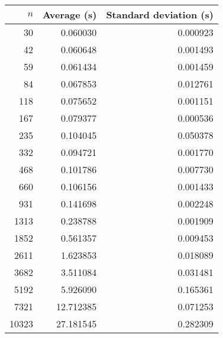 \begin{tabular}{rrr}
$n$ & Average (s) & Standard deviation (s)\\\hline
30 & 0.060030 & 0.000923\\
42 & 0.060648 & 0.001493\\
59 & 0.061434 & 0.001459\\
84 & 0.067853 & 0.012761\\
118 & 0.075652 & 0.001151\\
167 & 0.079377 & 0.000536\\
235 & 0.104045 & 0.050378\\
332 & 0.094721 & 0.001770\\
468 & 0.101786 & 0.007730\\
660 & 0.106156 & 0.001433\\
931 & 0.141698 & 0.002248\\
1313 & 0.238788 & 0.001909\\
1852 & 0.561357 & 0.009453\\
2611 & 1.623853 & 0.018089\\
3682 & 3.511084 & 0.031481\\
5192 & 5.926090 & 0.165361\\
7321 & 12.712385 & 0.071253\\
10323 & 27.181545 & 0.282309\\
\end{tabular}
